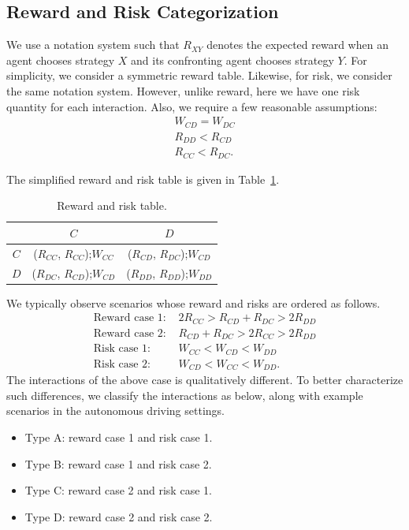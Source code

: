 \documentclass[letterpaper]{article} %
\begin{document}
\subsection{Reward and Risk Categorization}
\label{sec:reward_risk_categories}
We use a notation system such that $R_{XY}$ denotes the expected reward when an agent chooses strategy $X$ and its confronting agent chooses strategy $Y$. For simplicity, we consider a symmetric reward table. Likewise, for risk, we consider the same notation system. However, unlike reward, here we have one risk quantity for each interaction. Also, we require a few reasonable assumptions:
\begin{gather}
    W_{CD}=W_{DC} \\
    R_{DD}<R_{CD}\label{eq:assumption2}\\
    R_{CC}<R_{DC}.\label{eq:assumption3}
\end{gather}

The simplified reward and risk table is given in Table~\ref{tab:general_reward}.
\begin{table}[H]
    \centering
    \begin{tabular}{c|c|c}
         & $C$ & $D$ \\\hline
        $C$ & ($R_{CC}$, $R_{CC}$);$W_{CC}$ & ($R_{CD}$, $R_{DC}$);$W_{CD}$ \\
        $D$ & ($R_{DC}$, $R_{CD}$);$W_{CD}$ & ($R_{DD}$, $R_{DD}$);$W_{DD}$
    \end{tabular}
    \caption{Reward and risk table.}
    \label{tab:general_reward}
\end{table}
We typically observe scenarios whose reward and risks are ordered as follows.
\begin{align}
    \textrm{Reward case 1: }&2R_{CC}>R_{CD}+R_{DC}>2R_{DD} \label{eq:reward_case1}\\
    \textrm{Reward case 2: }&R_{CD}+R_{DC}>2R_{CC}>2R_{DD} \label{eq:reward_case2}\\
    \textrm{Risk case 1: }&W_{CC}<W_{CD}<W_{DD}\\
    \textrm{Risk case 2: }&W_{CD}<W_{CC}<W_{DD}.
\end{align}
The interactions of the above case is qualitatively different. To better characterize such differences, we classify the interactions as below, along with example scenarios in the autonomous driving settings.
\begin{itemize}
    \item Type A: reward case 1 and risk case 1.
    \item Type B: reward case 1 and risk case 2.
    \item Type C: reward case 2 and risk case 1.
    \item Type D: reward case 2 and risk case 2.
\end{itemize}
\end{document}
